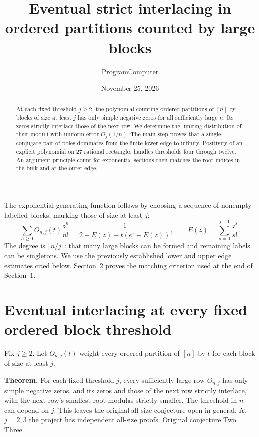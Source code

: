 \documentclass[11pt]{article}
\title{Eventual strict interlacing in ordered partitions counted by large blocks}
\author{ProgramComputer}
\date{November 25, 2026}
\begin{document}
\maketitle
\begin{abstract}
At each fixed threshold $j\ge2$, the polynomial counting ordered partitions of $[n]$ by blocks of size at least $j$ has only simple negative zeros for all sufficiently large $n$. Its zeros strictly interlace those of the next row. We determine the limiting distribution of their moduli with uniform error $O_j(1/n)$. The main step proves that a single conjugate pair of poles dominates from the finite lower edge to infinity. Positivity of an explicit polynomial on 27 rational rectangles handles thresholds four through twelve. An argument-principle count for exponential sections then matches the root indices in the bulk and at the outer edge.
\end{abstract}
The exponential generating function follows by choosing a sequence of nonempty labelled blocks, marking those of size at least $j$:
\[
 \sum_{n\ge0} O_{n,j}(t)\frac{z^n}{n!}
 =\frac{1}{2-E(z)-t(e^z-E(z))},\qquad E(z)=\sum_{s=0}^{j-1}\frac{z^s}{s!}.
\]
The degree is $\lfloor n/j\rfloor$: that many large blocks can be formed and remaining labels can be singletons. We use the previously established lower and upper edge estimates cited below. Section~2 proves the matching criterion used at the end of Section~1.
\section{Eventual interlacing at every fixed ordered block threshold}

Fix $j\ge2$. Let $O_{n,j}(t)$ weight every ordered partition of $[n]$ by $t$ for each block of size at least $j$.

\textbf{Theorem.} For each fixed threshold $j$, every sufficiently large row $O_{n,j}$ has only simple negative zeros, and its zeros and those of the next row strictly interlace, with the next row's smallest root modulus strictly smaller. The threshold in $n$ can depend on $j$. This leaves the original all-size conjecture open in general. At $j=2,3$ the project has independent all-size proofs. \href{https://www.symmetricfunctions.com/realRootedOpenProblems.htm\#openProblemsSetPartitions}{Original conjecture} \enspace \href{https://github.com/ProgramComputer/open-math-research/blob/main/topics/ordered-large-blocks/threshold-two.md}{Two} \enspace \href{https://github.com/ProgramComputer/open-math-research/blob/main/topics/ordered-large-blocks/threshold-three.md}{Three}
\end{document}
